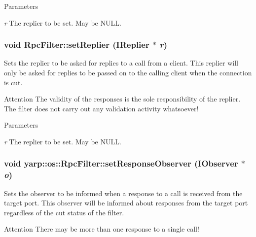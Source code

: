 \begin{DoxyParams}{Parameters}
\item[{\em r}]The replier to be set. May be {\ttfamily NULL}. \end{DoxyParams}
\hypertarget{classyarp_1_1os_1_1_rpc_filter_a266cce1c8c9088b26ad7d6c65fc2201f}{
\subsubsection[{setReplier}]{\setlength{\rightskip}{0pt plus 5cm}void RpcFilter::setReplier ({\bf IReplier} $\ast$ {\em r})}}
\label{classyarp_1_1os_1_1_rpc_filter_a266cce1c8c9088b26ad7d6c65fc2201f}
Sets the replier to be asked for replies to a call from a client. This replier will only be asked for replies to be passed on to the calling client when the connection is cut.

\begin{DoxyAttention}{Attention}
The validity of the responses is the sole responsibility of the replier. The filter does not carry out any validation activity whatsoever! 
\end{DoxyAttention}

\begin{DoxyParams}{Parameters}
\item[{\em r}]The replier to be set. May be {\ttfamily NULL}. \end{DoxyParams}
\hypertarget{classyarp_1_1os_1_1_rpc_filter_a42d86d2f0a2828c57e398cced6fdadb8}{
\subsubsection[{setResponseObserver}]{\setlength{\rightskip}{0pt plus 5cm}void yarp::os::RpcFilter::setResponseObserver ({\bf IObserver} $\ast$ {\em o})}}
\label{classyarp_1_1os_1_1_rpc_filter_a42d86d2f0a2828c57e398cced6fdadb8}
Sets the observer to be informed when a response to a call is received from the target port. This observer will be informed about responses from the target port regardless of the cut status of the filter.

\begin{DoxyAttention}{Attention}
There may be more than one response to a single call! 
\end{DoxyAttention}

